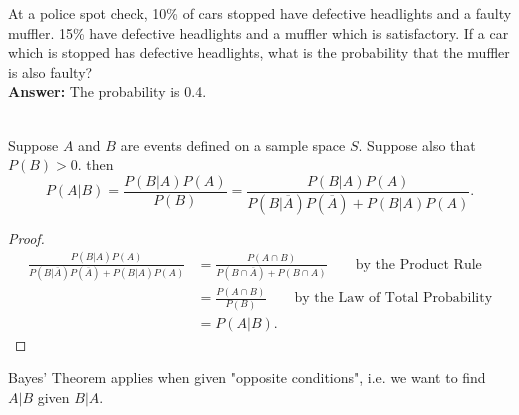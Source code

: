 \begin{example}
    At a police spot check, 10\% of cars stopped have defective headlights and a faulty muffler. 15\% have defective headlights and a
    muffler which is satisfactory. If a car which is stopped has defective headlights, what is the probability that the muffler is also faulty? \\
    \textbf{Answer: } The probability is 0.4.
\end{example}

\pagebreak


\begin{theorem}
    \phantom{}  \\
    Suppose $A$ and $B$ are events defined on a sample space $S$. Suppose also that
    $P(B)  > 0$. then
    \[P(A|B) = \frac{P(B|A) P(A)}{P(B)} = \frac{P(B|A) P(A)}{P(B|\overline{A}) P(\overline{A}) + P(B|A) P(A)}.\]
\end{theorem}

\begin{proof}
    \begin{align*}
        \frac{P(B|A) P(A)}{P(B|\overline{A}) P(\overline{A}) + P(B|A) P(A)} &=
        \frac{P(A \cap B)}{P(B \cap \overline{A}) + P(B \cap A)}  \qquad \text{by the Product Rule}   \\
        &= \frac{P(A \cap B)}{P(B)}   \qquad \text{by the Law of Total Probability}  \\
        &= P(A|B).
    \end{align*}
\end{proof}

\begin{remark}
    Bayes' Theorem applies when given "opposite conditions", i.e. we want to find $A|B$ given $B|A$.
\end{remark}



\newpage